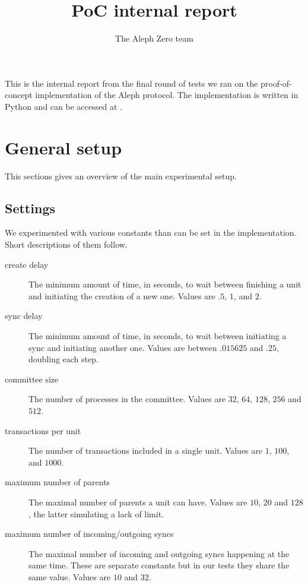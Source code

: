 \documentclass[a4paper,10pt]{article}
\title{PoC internal report}
\author{The Aleph Zero team}
\begin{document}
 \maketitle
	This is the internal report from the final round of tests we ran on the proof-of-concept implementation of the Aleph protocol.
	The implementation is written in Python and can be accessed at .
	\section{General setup}
	This sections gives an overview of the main experimental setup.
		\subsection{Settings}
			We experimented with various constants than can be set in the implementation. Short descriptions of them follow.
			\begin{description}
				\item[create delay] The minimum amount of time, in seconds, to wait between finishing a unit and initiating the creation of a new one. Values are $.5$, $1$, and $2$.
				\item[sync delay] The minimum amount of time, in seconds, to wait between initiating a sync and initiating another one. Values are between $.015625$ and $.25$, doubling each step.
				\item[committee size] The number of processes in the committee. Values are $32$, $64$, $128$, $256$ and $512$.
				\item[transactions per unit] The number of transactions included in a single unit. Values are $1$, $100$, and $1000$.
				\item[maximum number of parents] The maximal number of parents a unit can have. Values are $10$, $20$ and $128$, the latter simulating a lack of limit.
				\item[maximum number of incoming/outgoing syncs] The maximal number of incoming and outgoing syncs happening at the same time.
					These are separate constants but in our tests they share the same value. Values are $10$ and $32$.
			\end{description}
\end{document}
